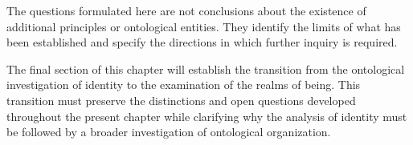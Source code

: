 The questions formulated here are not conclusions
about the existence of additional principles or
ontological entities. They identify the limits of
what has been established and specify the directions
in which further inquiry is required.

The final section of this chapter will establish the
transition from the ontological investigation of
identity to the examination of the realms of being.
This transition must preserve the distinctions and
open questions developed throughout the present
chapter while clarifying why the analysis of identity
must be followed by a broader investigation of
ontological organization.

